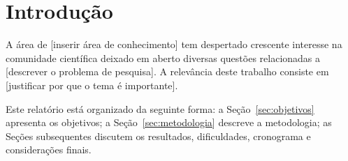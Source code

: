 \section{Introdução}\label{sec:introducao}


A área de [inserir área de conhecimento] tem despertado crescente interesse na comunidade científica
deixado em aberto diversas questões relacionadas a [descrever o problema de pesquisa].
A relevância deste trabalho consiste em [justificar por que o tema é importante].

Este relatório está organizado da seguinte forma: a Seção~\ref{sec:objetivos} apresenta os
objetivos; a Seção~\ref{sec:metodologia} descreve a metodologia; as Seções
subsequentes discutem os resultados, dificuldades, cronograma e considerações finais.